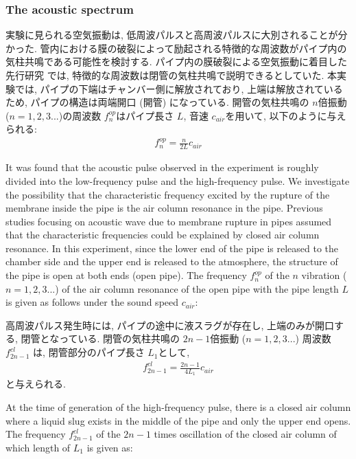 \documentclass[12pt]{article}
\begin{document}
\subsubsection{The acoustic spectrum}
実験に見られる空気振動は, 低周波パルスと高周波パルスに大別されることが分かった. 
管内における膜の破裂によって励起される特徴的な周波数がパイプ内の気柱共鳴である可能性を検討する. 
パイプ内の膜破裂による空気振動に着目した先行研究 \citep{Vidal2006a, Sanchez2014} では, 特徴的な周波数は閉管の気柱共鳴で説明できるとしていた. 
本実験では, パイプの下端はチャンバー側に解放されており, 上端は解放されているため, パイプの構造は両端開口 (開管) になっている. 
開管の気柱共鳴の $n$倍振動 ($n=1,2,3...$)の周波数 $f^{op}_{n}$はパイプ長さ $L$, 音速 $c_{air}$を用いて, 以下のように与えられる:
\begin{eqnarray}
f^{op}_{n}=\frac{n}{2L} c_{air}
\end{eqnarray}

It was found that the acoustic pulse observed in the experiment is roughly divided into the low-frequency pulse and the high-frequency pulse.
We investigate the possibility that the characteristic frequency excited by the rupture of the membrane inside the pipe is the air column resonance in the pipe.
Previous studies focusing on acoustic wave due to membrane rupture in pipes \citep{Vidal 2006a, Sanchez2014} assumed that the characteristic frequencies could be explained by closed air column resonance.
In this experiment, since the lower end of the pipe is released to the chamber side and the upper end is released to the atmosphere, the structure of the pipe is open at both ends (open pipe).
The frequency $ f^{op}_{n}$ of the $n$ vibration ($ n = 1, 2, 3 ... $) of the air column resonance of the open pipe with the pipe length $ L $ is given as follows under the sound speed $ c_{air}$:

高周波パルス発生時には, パイプの途中に液スラグが存在し, 上端のみが開口する, 閉管となっている. 
閉管の気柱共鳴の $2n-1$倍振動 ($n=1,2,3...$) 周波数 $f^{cl}_{2n-1}$ は, 閉管部分のパイプ長さ $L_1$として, 
\begin{eqnarray}
f^{cl}_{2n-1}=\frac{2n-1}{4L_1} c_{air}
\end{eqnarray}
と与えられる.

At the time of generation of the high-frequency pulse, there is a closed air column where a liquid slug exists in the middle of the pipe and only the upper end opens.
The frequency $f^{cl}_{2n-1}$ of the $2n-1$ times oscillation of the closed air column of which length of $L_1$ is given as:
\end{document}
